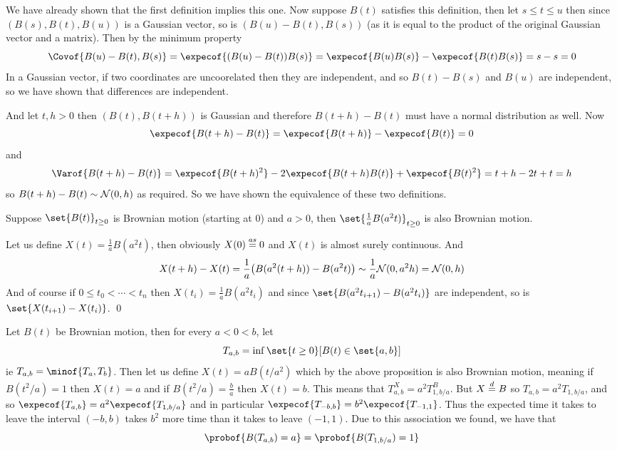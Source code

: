 \edefn

We have already shown that the first definition implies this one.
Now suppose $B(t)$ satisfies this definition, then let $s\leq t\leq u$ then since $(B(s),B(t),B(u))$ is a Gaussian vector, so is $(B(u)-B(t),B(s))$ (as it is equal to the product of the original Gaussian
vector and a matrix).
Then by the minimum property
$$ \Covof{B(u)-B(t),B(s)} = \expecof{(B(u)-B(t))B(s)} = \expecof{B(u)B(s)} - \expecof{B(t)B(s)} = s - s = 0 $$
In a Gaussian vector, if two coordinates are uncoorelated then they are independent, and so $B(t)-B(s)$ and $B(u)$ are independent, so we have shown that differences are independent.

And let $t,h>0$ then $(B(t),B(t+h))$ is Gaussian and therefore $B(t+h)-B(t)$ must have a normal distribution as well.
Now
$$ \expecof{B(t+h) - B(t)} = \expecof{B(t+h)} - \expecof{B(t)} = 0 $$
and
$$ \Varof{B(t+h) - B(t)} = \expecof{B(t+h)^2} - 2\expecof{B(t+h)B(t)} + \expecof{B(t)^2} = t+h - 2t + t = h $$
so $B(t+h)-B(t)\sim{\cal N}(0,h)$ as required.
So we have shown the equivalence of these two definitions.

\bprop[title=Scaling Invariance, name=scalinginvariance]

    Suppose $\set{B(t)}_{t\geq0}$ is Brownian motion (starting at $0$) and $a>0$, then $\set{\frac1a B(a^2t)}_{t\geq0}$ is also Brownian motion.

\eprop

Let us define $X(t)=\frac1aB(a^2t)$, then obviously $X(0)\buildrel as\over=0$ and $X(t)$ is almost surely continuous.
And
$$ X(t+h) - X(t) = \frac1a\bigl(B(a^2(t+h)) - B(a^2t)\bigr) \sim \frac1a{\cal N}(0, a^2h) = {\cal N}(0,h) $$
And of course if $0\leq t_0<\cdots<t_n$ then $X(t_i)=\frac1aB(a^2t_i)$ and since $\set{B(a^2t_{i+1})-B(a^2t_i)}$ are independent, so is $\set{X(t_{i+1})-X(t_i)}$.
\qed

Let $B(t)$ be Brownian motion, then for every $a<0<b$, let
$$ T_{a,b} = \inf\set{t\geq0}[B(t)\in\set{a,b}] $$
ie $T_{a,b}=\minof{T_a,T_b}$.
Then let us define $X(t)=aB(t/a^2)$ which by the above proposition is also Brownian motion, meaning if $B(t^2/a)=1$ then $X(t)=a$ and if $B(t^2/a)=\frac ba$ then $X(t)=b$.
This means that $T^X_{a,b}=a^2T^B_{1,b/a}$.
But $X\buildrel d\over=B$ so $T_{a,b}=a^2T_{1,b/a}$, and so $\expecof{T_{a,b}}=a^2\expecof{T_{1,b/a}}$ and in particular $\expecof{T_{-b,b}}=b^2\expecof{T_{-1,1}}$.
Thus the expected time it takes to leave the interval $(-b,b)$ takes $b^2$ more time than it takes to leave $(-1,1)$.
Due to this association we found, we have that
$$ \probof{B(T_{a,b}) = a} = \probof{B(T_{1,b/a})=1} $$

